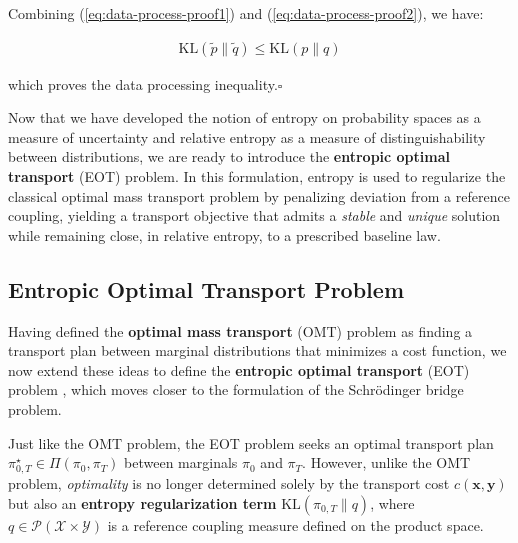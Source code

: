 \documentclass{article}
\newcommand{\boldtext}[1]{\textbf{\textcolor{MyGreen}{#1}}}
\begin{document}
Combining (\ref{eq:data-process-proof1}) and (\ref{eq:data-process-proof2}), we have:
\begin{small}
\begin{align}
    \boxed{\text{KL}(\tilde{p}\|\tilde{q})\leq \text{KL}(p\|q)}
\end{align}
\end{small}
which proves the data processing inequality.\hfill $\square$

Now that we have developed the notion of entropy on probability spaces as a measure of uncertainty and relative entropy as a measure of distinguishability between distributions, we are ready to introduce the \textbf{entropic optimal transport} (EOT) problem. In this formulation, entropy is used to regularize the classical optimal mass transport problem by penalizing deviation from a reference coupling, yielding a transport objective that admits a \textit{stable} and \textit{unique} solution while remaining close, in relative entropy, to a prescribed baseline law.

\subsection{Entropic Optimal Transport Problem}
\label{subsec:entropic-ot}
Having defined the \textbf{optimal mass transport} (OMT) problem as finding a transport plan between marginal distributions that minimizes a cost function, we now extend these ideas to define the \boldtext{entropic optimal transport} (EOT) problem \citep{nutz2021introduction, leonard2013survey}, which moves closer to the formulation of the Schrödinger bridge problem.

Just like the OMT problem, the EOT problem seeks an optimal transport plan $\pi_{0,T}^\star\in \Pi(\pi_0, \pi_T)$ between marginals $\pi_0$ and $\pi_T$. However, unlike the OMT problem, \textit{optimality} is no longer determined solely by the transport cost $c(\boldsymbol{x},\boldsymbol{y})$ but also an \textbf{entropy regularization term} $\text{KL}(\pi_{0,T}\|q)$, where $q\in \mathcal{P}(\mathcal{X}\times\mathcal{Y})$ is a reference coupling measure defined on the product space.
\end{document}
